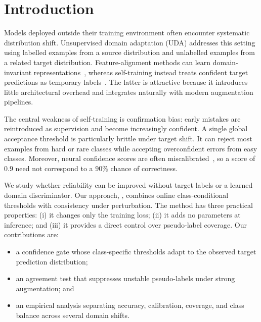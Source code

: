 \section{Introduction}

Models deployed outside their training environment often encounter systematic
distribution shift. Unsupervised domain adaptation (UDA) addresses this setting
using labelled examples from a source distribution and unlabelled examples from
a related target distribution. Feature-alignment methods can learn
domain-invariant representations~\citep{ganin2016domain,tzeng2017adversarial},
whereas self-training instead treats confident target predictions as temporary
labels~\citep{french2018self,sohn2020fixmatch}. The latter is attractive because
it introduces little architectural overhead and integrates naturally with
modern augmentation pipelines.

The central weakness of self-training is confirmation bias: early mistakes are
reintroduced as supervision and become increasingly confident. A single global
acceptance threshold is particularly brittle under target shift. It can reject
most examples from hard or rare classes while accepting overconfident errors
from easy classes. Moreover, neural confidence scores are often
miscalibrated~\citep{guo2017calibration}, so a score of $0.9$ need not correspond
to a $90\%$ chance of correctness.

We study whether reliability can be improved without target labels or a learned
domain discriminator. Our approach, \method, combines online
class-conditional thresholds with consistency under perturbation. The method
has three practical properties: (i) it changes only the training loss;
(ii) it adds no parameters at inference; and (iii) it provides a direct control
over pseudo-label coverage. Our contributions are:

\begin{itemize}
  \item a confidence gate whose class-specific thresholds adapt to the observed
        target prediction distribution;
  \item an agreement test that suppresses unstable pseudo-labels under strong
        augmentation; and
  \item an empirical analysis separating accuracy, calibration, coverage, and
        class balance across several domain shifts.
\end{itemize}

